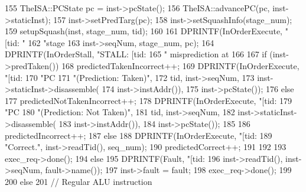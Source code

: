 \begin{DoxyCode}
{{{{{{155                         TheISA::PCState pc = inst->pcState();
156                         TheISA::advancePC(pc, inst->staticInst);
157                         inst->setPredTarg(pc);
158                         inst->setSquashInfo(stage_num);
159                         setupSquash(inst, stage_num, tid);
160 
161                         DPRINTF(InOrderExecute, "[tid:%
       "
162                                 "stage %
163                                 inst->seqNum, stage_num, pc);
164                         DPRINTF(InOrderStall, "STALL: [tid:%
165                                 " misprediction at %
166 
167                         if (inst->predTaken()) {
168                             predictedTakenIncorrect++;
169                             DPRINTF(InOrderExecute, "[tid:%
170                                     "PC %
171                                     "(Prediction: Taken)\n",
172                                     tid, inst->seqNum,
173                                     inst->staticInst->disassemble(
174                                         inst->instAddr()),
175                                     inst->pcState());
176                         } else {
177                             predictedNotTakenIncorrect++;
178                             DPRINTF(InOrderExecute, "[tid:%
179                                     "PC %
180                                     "(Prediction: Not Taken)\n",
181                                     tid, inst->seqNum,
182                                     inst->staticInst->disassemble(
183                                         inst->instAddr()),
184                                     inst->pcState());
185                         }
186                         predictedIncorrect++;
187                     } else {
188                         DPRINTF(InOrderExecute, "[tid:%
189                                 "Correct.\n", inst->readTid(), seq_num);
190                         predictedCorrect++;
191                     }
192 
193                     exec_req->done();
194                 } else {
195                     DPRINTF(Fault, "[tid:%
196                             inst->readTid(), inst->seqNum, fault->name());
197                     inst->fault = fault;
198                     exec_req->done();
199                 }
200             } else {
201                 // Regular ALU instruction
}}}}
\end{DoxyCode}
